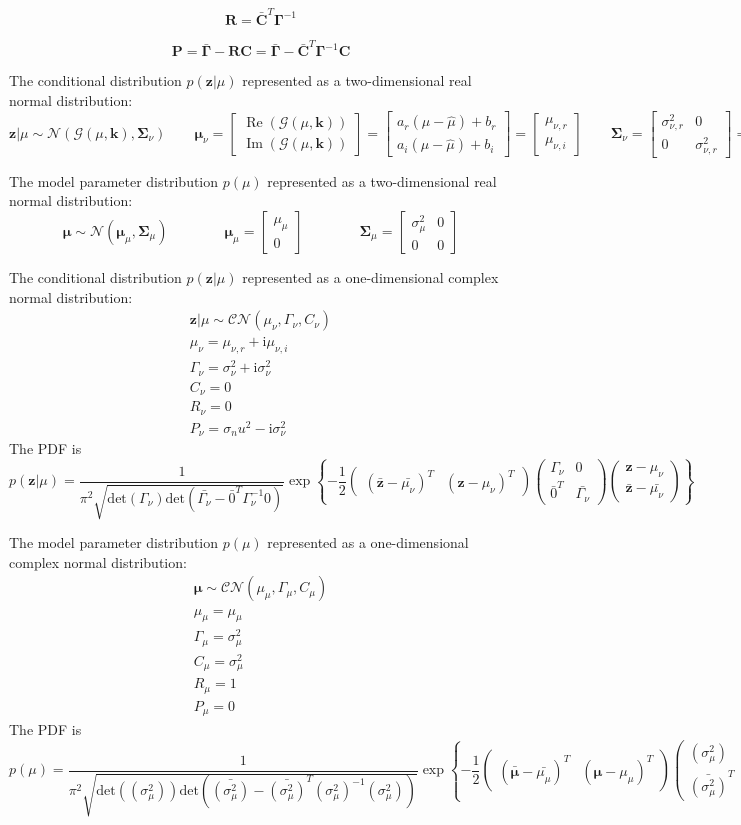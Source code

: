\documentclass{article}         %
\theoremstyle{definition}
\theoremstyle{remark}
\newcommand{\eq}[1]{\begin{equation} #1 \end{equation}}
\newcommand{\Pbf}{\mathbf{P}}
\newcommand{\Rbf}{\mathbf{R}}
\newcommand{\zbf}{\mathbf{z}}
\newcommand{\mubf}{\boldsymbol{\mu}}
\newcommand{\Gammabf}{\mathbf{\Gamma}}
\newcommand{\Cbf}{\mathbf{C}}
\newcommand{\Sigmabf}{\boldsymbol{\Sigma}}
\newcommand{\zcond}{\mathbf{z}|\mu}
\newcommand{\signalG}{\mathcal{G}\paren{\mu,\mathbf{k}}}
\newcommand{\Nscript}{\mathcal{N}}
\newcommand{\CNscript}{\mathcal{CN}}
\newcommand{\im}{\mathrm{i}}
\newcommand{\paren}[1]{\left(#1\right)}
\newcommand{\bracket}[1]{\left[#1\right]}
\newcommand{\arr}[2]{\begin{array}{#1} #2 \end{array}}
\newcommand{\brkarray}[2]{\bracket{\arr{#1}{#2}}}
\newcommand{\reop}[1]{\operatorname{Re}\paren{#1}}
\newcommand{\imop}[1]{\operatorname{Im}\paren{#1}}
\newcommand{\qq}{\qquad\qquad}
\newcommand{\CNpdf}[5]{\frac{1}{\pi^{#1}\sqrt{\mathrm{det}\paren{#4}\mathrm{det}\paren{\bar{#4} - \bar{#5}^T#4^{-1}#5}}} \exp\left\{-\frac{1}{2} \paren{\begin{array}{cc}\paren{\bar{#2} - \bar{#3}}^T & \paren{#2 - #3}^T\end{array}} \paren{\begin{array}{cc} #4 & #5 \\ \bar{#5}^T & \bar{#4} \end{array}}\paren{\begin{array}{c} #2 - #3 \\ \bar{#2} - \bar{#3} \end{array}}\right\}}
\begin{document}
\eq{\Rbf = \bar{\Cbf}^T\Gammabf^{-1}}

\eq{\Pbf = \bar{\Gammabf} - \Rbf\Cbf = \bar{\Gammabf} - \bar{\Cbf}^T\Gammabf^{-1}\Cbf}

The conditional distribution $p\paren{\zcond}$ represented as a two-dimensional real normal distribution:
\eq{\zcond \sim \Nscript\paren{\signalG,\Sigmabf_\nu} 
	\qquad \mubf_\nu = \bracket{\arr{c}{ \reop{\signalG} \\ \imop{\signalG} }} = \brkarray{c}{ a_r\paren{\mu - \hat{\mu}} + b_r \\ a_i\paren{\mu - \hat{\mu}} + b_i } = \bracket{\arr{c}{ \mu_{\nu,r} \\ \mu_{\nu,i} }}
	\qquad \Sigmabf_\nu = \brkarray{cc}{ \sigma_{\nu,r}^2 & 0 \\ 0 & \sigma_{\nu,r}^2 } = \brkarray{cc}{ \sigma_\nu^2 & 0 \\ 0 & \sigma_\nu^2 }}

The model parameter distribution $p\paren{\mu}$ represented as a two-dimensional real normal distribution:
\eq{\mubf \sim \Nscript\paren{\mubf_\mu,\Sigmabf_\mu}
	\qq \mubf_\mu = \brkarray{c}{ \mu_\mu \\ 0 }
	\qq \Sigmabf_\mu = \brkarray{cc}{ \sigma_\mu^2 & 0 \\ 0 & 0 }}

The conditional distribution $p\paren{\zcond}$ represented as a one-dimensional complex normal distribution:
\eq{\arr{c}{ \zcond\sim\CNscript\paren{\mu_\nu,\Gamma_\nu,C_\nu} \\
	\mu_\nu = \mu_{\nu,r} + \im\mu_{\nu,i} \\
	\Gamma_\nu = \sigma_\nu^2 + \im\sigma_\nu^2 \\
	C_\nu = 0 \\
	R_\nu = 0 \\
	P_\nu = \sigma_nu^2 - \im\sigma_\nu^2 }}
The PDF is
\eq{p\paren{\zcond} = \CNpdf{2}{\zbf}{\mu_\nu}{\Gamma_\nu}{0}} 

The model parameter distribution $p\paren{\mu}$ represented as a one-dimensional complex normal distribution:
\eq{\arr{c}{ \mubf \sim \CNscript\paren{\mu_\mu,\Gamma_\mu,C_\mu} \\
	\mu_\mu = \mu_\mu \\
	\Gamma_\mu = \sigma_\mu^2 \\
	C_\mu = \sigma_\mu^2 \\
	R_\mu = 1 \\
	P_\mu = 0 }}
The PDF is
\eq{p\paren{\mu} = \CNpdf{2}{\mubf}{\mu_\mu}{\paren{\sigma_\mu^2}}{\paren{\sigma_\mu^2}}}
\end{document}
